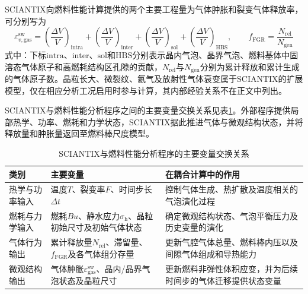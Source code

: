 SCIANTIX向燃料性能计算提供的两个主要工程量为气体肿胀和裂变气体释放率，可分别写为
\begin{equation}
	\varepsilon_{v,\mathrm{gas}}^{\mathrm{sw}}
	=
	\left(\frac{\Delta V}{V}\right)_{\mathrm{intra}}
	+
	\left(\frac{\Delta V}{V}\right)_{\mathrm{inter}}
	+
	\left(\frac{\Delta V}{V}\right)_{\mathrm{sol}}
	+
	\left(\frac{\Delta V}{V}\right)_{\mathrm{HBS}},
	\qquad
	f_{\mathrm{FGR}}
	=
	\frac{N_{\mathrm{rel}}}{N_{\mathrm{gen}}}
	\label{eq:sciantix_engineering_outputs}
\end{equation}
式中：下标$\mathrm{intra}$、$\mathrm{inter}$、$\mathrm{sol}$和$\mathrm{HBS}$分别表示晶内气泡、晶界气泡、燃料基体中固溶态气体原子和高燃耗结构区孔隙的贡献，$N_{\mathrm{rel}}$与$N_{\mathrm{gen}}$分别为累计释放和累计生成的气体原子数。晶粒长大、微裂纹、氦气及放射性气体衰变属于SCIANTIX的扩展模型，仅在相应分析工况启用时参与计算，其内部经验关系不在正文中列出\cite{baraniAnalysisTransientFission2017,pastoreModellingTransientFission2014}。


SCIANTIX与燃料性能分析程序之间的主要变量交换关系见表\ref{tab:sciantix_coupling_variables}。外部程序提供局部热学、功率、燃耗和力学状态，SCIANTIX据此推进气体与微观结构状态，并将释放量和肿胀量返回至燃料棒尺度模型。

\begin{table}[htbp]
	\centering
	\renewcommand{\arraystretch}{1.18}
	\caption{SCIANTIX与燃料性能分析程序的主要变量交换关系}
	\label{tab:sciantix_coupling_variables}
	\begin{tabularx}{\textwidth}{p{2.6cm}X X}
		\toprule
		{\centering 类别\par} & {\centering 主要变量\par} & {\centering 在耦合计算中的作用\par} \\
		\midrule
		热学与功率输入
		& 温度$T$、裂变率$F$、时间步长$\Delta t$
		& 控制气体生成、热扩散及温度相关的气泡演化过程 \\
		燃耗与力学输入
		& 燃耗$Bu$、静水应力$\sigma_{\mathrm{h}}$、晶粒初始尺寸及初始气体状态
		& 确定微观结构状态、气泡平衡压力及历史变量的演化 \\
		气体行为输出
		& 累计释放量$N_{\mathrm{rel}}$、滞留量、$f_{\mathrm{FGR}}$及各气体组分存量
		& 更新气腔气体总量、燃料棒内压以及间隙气体组成和导热能力 \\
		微观结构输出
		& 气体肿胀$\varepsilon_{\mathrm{gas}}^{\mathrm{sw}}$、晶内/晶界气泡状态及晶粒尺寸
		& 更新燃料非弹性体积应变，并为后续时间步的气体迁移提供状态变量 \\
		\bottomrule
	\end{tabularx}
\end{table}


